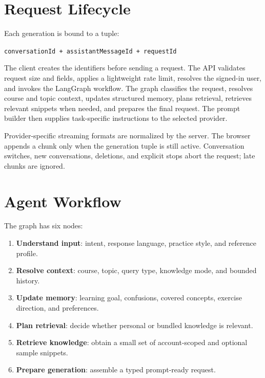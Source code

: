 \documentclass[a4paper,11pt]{article}
\begin{document}
\section{Request Lifecycle}

Each generation is bound to a tuple:

\begin{center}
\texttt{conversationId + assistantMessageId + requestId}
\end{center}

The client creates the identifiers before sending a request. The API validates request size and fields, applies a lightweight rate limit, resolves the signed-in user, and invokes the LangGraph workflow. The graph classifies the request, resolves course and topic context, updates structured memory, plans retrieval, retrieves relevant snippets when needed, and prepares the final request. The prompt builder then supplies task-specific instructions to the selected provider.

Provider-specific streaming formats are normalized by the server. The browser appends a chunk only when the generation tuple is still active. Conversation switches, new conversations, deletions, and explicit stops abort the request; late chunks are ignored.

\section{Agent Workflow}

The graph has six nodes:

\begin{enumerate}[leftmargin=2em]
  \item \textbf{Understand input}: intent, response language, practice style, and reference profile.
  \item \textbf{Resolve context}: course, topic, query type, knowledge mode, and bounded history.
  \item \textbf{Update memory}: learning goal, confusions, covered concepts, exercise direction, and preferences.
  \item \textbf{Plan retrieval}: decide whether personal or bundled knowledge is relevant.
  \item \textbf{Retrieve knowledge}: obtain a small set of account-scoped and optional sample snippets.
  \item \textbf{Prepare generation}: assemble a typed prompt-ready request.
\end{enumerate}
\end{document}
